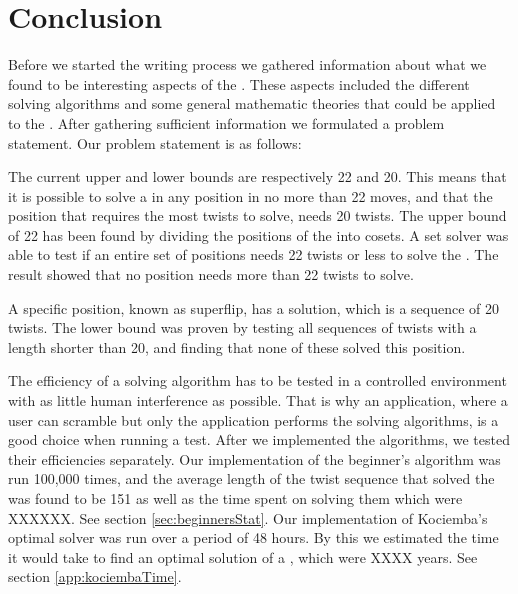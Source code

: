 \chapter{Conclusion}
Before we started the writing process we gathered information about what we found to be interesting aspects of the \rubik{}. 
These aspects included the different solving algorithms and some general mathematic theories that could be applied to the \rubik{}.
After gathering sufficient information we formulated a problem statement. Our problem statement is as follows:


\linebreak

The current upper and lower bounds are respectively 22 and 20. 
This means that it is possible to solve a \rubik{} in any position in no more than 22 moves, and that the \rubik{} position that requires the most twists to solve, needs 20 twists.
The upper bound of 22 has been found by dividing the positions of the \rubik{} into cosets. A set solver was able to test if an entire set of positions needs 22 twists or less to solve the \rubik{}. The result showed that no \rubik{} position needs more than 22 twists to solve.

A specific \rubik{} position, known as superflip, has a solution, which is a sequence of 20 twists.
The lower bound was proven by testing all sequences of twists with a length shorter than 20, and finding that none of these solved this position.

The efficiency of a solving algorithm has to be tested in a controlled environment with as little human interference as possible. 
That is why an application, where a user can scramble but only the application performs the solving algorithms, is a good choice when running a test.
After we implemented the algorithms, we tested their efficiencies separately.
Our implementation of the beginner's algorithm was run 100,000 times, and the average length of the twist sequence that solved the \rubik{} was found to be 151 as well as the time spent on solving them which were XXXXXX. See section \ref{sec:beginnersStat}. 
Our implementation of Kociemba's optimal solver was run over a period of 48 hours. By this we estimated the time it would take to find an optimal solution of a \rubik{}, which were XXXX years. See section \ref{app:kociembaTime}.




\begin{comment}
There are many algorithms, which can solve the \rubik{}. 
There are generally two types of algorithms; algorithms for human solving and algorithms for computer solving. 
A requirement for the human algorithms is that one should be able to remember it, which limits the effectiveness. 
The computer algorithms are generally based upon systematic trial and error, which is why they are not effective to use as a human solver.
The human algorithms are time-wise efficient both for a human and a computer solver, but are not twist-wise efficient.
The computer algorithms require a lot of time, but give a twist-wise efficient result.
\end{comment}